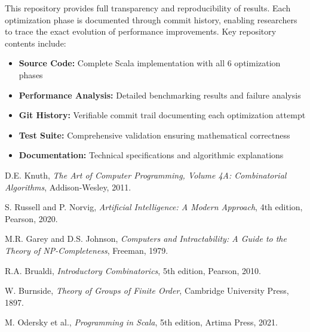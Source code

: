 \documentclass[12pt,a4paper]{article}
\theoremstyle{definition}
\begin{document}
This repository provides full transparency and reproducibility of results. Each optimization phase is documented through commit history, enabling researchers to trace the exact evolution of performance improvements. Key repository contents include:

\begin{itemize}
\item \textbf{Source Code:} Complete Scala implementation with all 6 optimization phases
\item \textbf{Performance Analysis:} Detailed benchmarking results and failure analysis
\item \textbf{Git History:} Verifiable commit trail documenting each optimization attempt
\item \textbf{Test Suite:} Comprehensive validation ensuring mathematical correctness
\item \textbf{Documentation:} Technical specifications and algorithmic explanations
\end{itemize}


\begin{thebibliography}{99}

D.E. Knuth, \emph{The Art of Computer Programming, Volume 4A: Combinatorial Algorithms}, Addison-Wesley, 2011.

S. Russell and P. Norvig, \emph{Artificial Intelligence: A Modern Approach}, 4th edition, Pearson, 2020.

M.R. Garey and D.S. Johnson, \emph{Computers and Intractability: A Guide to the Theory of NP-Completeness}, Freeman, 1979.

R.A. Brualdi, \emph{Introductory Combinatorics}, 5th edition, Pearson, 2010.

W. Burnside, \emph{Theory of Groups of Finite Order}, Cambridge University Press, 1897.

M. Odersky et al., \emph{Programming in Scala}, 5th edition, Artima Press, 2021.

\end{thebibliography}
\end{document}
